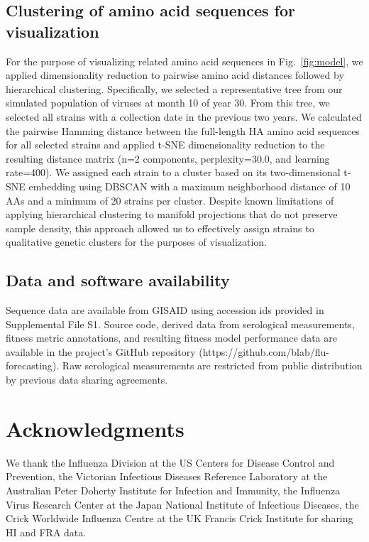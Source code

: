\subsection*{Clustering of amino acid sequences for visualization}

For the purpose of visualizing related amino acid sequences in Fig.~\ref{fig:model}, we applied dimensionality reduction to pairwise amino acid distances followed by hierarchical clustering.
Specifically, we selected a representative tree from our simulated population of viruses at month 10 of year 30.
From this tree, we selected all strains with a collection date in the previous two years.
We calculated the pairwise Hamming distance between the full-length HA amino acid sequences for all selected strains and applied t-SNE dimensionality reduction \cite{vanDerMaaten2008} to the resulting distance matrix (n=2 components, perplexity=30.0, and learning rate=400).
We assigned each strain to a cluster based on its two-dimensional t-SNE embedding using DBSCAN \cite{Ester1996} with a maximum neighborhood distance of 10 AAs and a minimum of 20 strains per cluster.
Despite known limitations of applying hierarchical clustering to manifold projections that do not preserve sample density, this approach allowed us to effectively assign strains to qualitative genetic clusters for the purposes of visualization.

\subsection*{Data and software availability}

Sequence data are available from GISAID using accession ids provided in Supplemental File S1.
Source code, derived data from serological measurements, fitness metric annotations, and resulting fitness model performance data are available in the project's GitHub repository (https://github.com/blab/flu-forecasting).
Raw serological measurements are restricted from public distribution by previous data sharing agreements.

\section*{Acknowledgments}

We thank the Influenza Division at the US Centers for Disease Control and Prevention, the Victorian Infectious Diseases Reference Laboratory at the Australian Peter Doherty Institute for Infection and Immunity, the Influenza Virus Research Center at the Japan National Institute of Infectious Diseases, the Crick Worldwide Influenza Centre at the UK Francis Crick Institute for sharing HI and FRA data.

